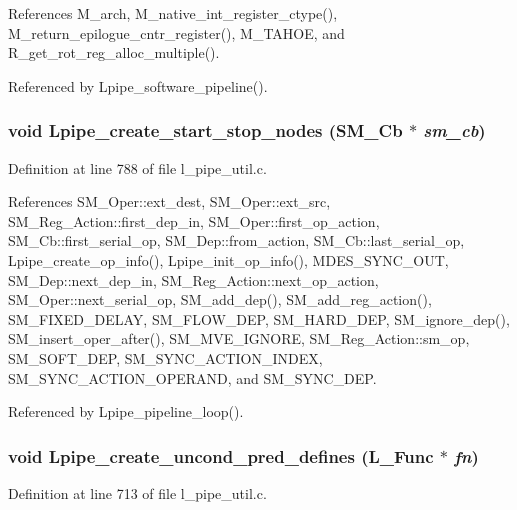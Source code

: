 References M\_\-arch, M\_\-native\_\-int\_\-register\_\-ctype(), M\_\-return\_\-epilogue\_\-cntr\_\-register(), M\_\-TAHOE, and R\_\-get\_\-rot\_\-reg\_\-alloc\_\-multiple().

Referenced by Lpipe\_\-software\_\-pipeline().
\subsubsection{\setlength{\rightskip}{0pt plus 5cm}void Lpipe\_\-create\_\-start\_\-stop\_\-nodes (\bf{SM\_\-Cb} $\ast$ {\em sm\_\-cb})}\label{l__pipe__util_8c_4d45e5623b3ff132a813e2a9adf69150}




Definition at line 788 of file l\_\-pipe\_\-util.c.

References SM\_\-Oper::ext\_\-dest, SM\_\-Oper::ext\_\-src, SM\_\-Reg\_\-Action::first\_\-dep\_\-in, SM\_\-Oper::first\_\-op\_\-action, SM\_\-Cb::first\_\-serial\_\-op, SM\_\-Dep::from\_\-action, SM\_\-Cb::last\_\-serial\_\-op, Lpipe\_\-create\_\-op\_\-info(), Lpipe\_\-init\_\-op\_\-info(), MDES\_\-SYNC\_\-OUT, SM\_\-Dep::next\_\-dep\_\-in, SM\_\-Reg\_\-Action::next\_\-op\_\-action, SM\_\-Oper::next\_\-serial\_\-op, SM\_\-add\_\-dep(), SM\_\-add\_\-reg\_\-action(), SM\_\-FIXED\_\-DELAY, SM\_\-FLOW\_\-DEP, SM\_\-HARD\_\-DEP, SM\_\-ignore\_\-dep(), SM\_\-insert\_\-oper\_\-after(), SM\_\-MVE\_\-IGNORE, SM\_\-Reg\_\-Action::sm\_\-op, SM\_\-SOFT\_\-DEP, SM\_\-SYNC\_\-ACTION\_\-INDEX, SM\_\-SYNC\_\-ACTION\_\-OPERAND, and SM\_\-SYNC\_\-DEP.

Referenced by Lpipe\_\-pipeline\_\-loop().
\subsubsection{\setlength{\rightskip}{0pt plus 5cm}void Lpipe\_\-create\_\-uncond\_\-pred\_\-defines (L\_\-Func $\ast$ {\em fn})}\label{l__pipe__util_8c_8e12dca1f06e9f8f224a39473ba1bb81}




Definition at line 713 of file l\_\-pipe\_\-util.c.

